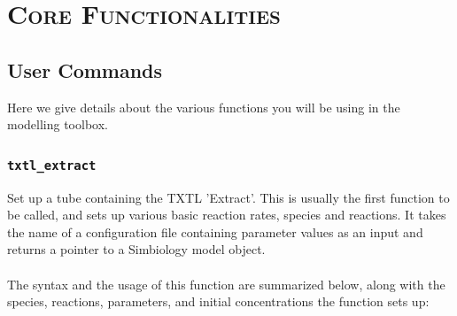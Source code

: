 \documentclass[english]{report}
\begin{document}
	
\chapter{\textsc{Core Functionalities}} 
	\section{User Commands}	
	Here we give details about the various functions you will be using in the modelling toolbox. 	

		\subsection*{\texttt{txtl\_extract}}
			Set up a tube containing the TXTL 'Extract'. This is usually the first function to be called, and sets up various basic reaction rates, species and reactions. It takes the name of a configuration file containing parameter values as an input and returns a pointer to a Simbiology model object.  \\	
			\\
			The syntax and the usage of this function are summarized below, along with the species, reactions, parameters, and initial concentrations the function sets up:
			
\end{document}
